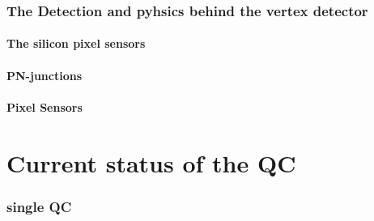 \documentclass[a4paper, 12pt]{article}
\begin{document}
{\section{The Detection and pyhsics behind the vertex detector}
\subsection{The silicon pixel sensors}
\subsection{PN-junctions}
\subsection{Pixel Sensors}

\part{Current status of the QC}
\section{single QC}




}







\clearpage

 
\end{document}
